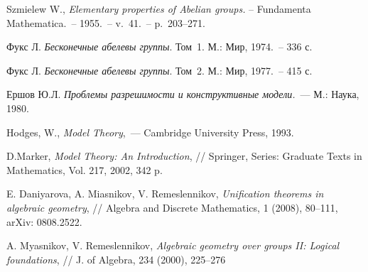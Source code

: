 \documentclass[a4paper,11pt,twoside]{article}
\begin{document}
\begin{thebibliography}{}

 Szmielew W., \textit{Elementary properties of Abelian groups.} -- Fundamenta Mathematica.~-- 1955.~-- v.~41.~-- p.~203--271.

 Фукс Л. \textit{Бесконечные абелевы группы}. Том~1. М.: Мир, 1974.~-- 336 с.

 Фукс Л. \textit{Бесконечные абелевы группы}. Том~2. М.: Мир, 1977.~-- 415 с.

 Ершов Ю.Л. \textit{Проблемы разрешимости и конструктивные модели.}~--- М.: Наука, 1980.

 Hodges, W., \textit{Model Theory},~--- Cambridge University Press, 1993. 

 D.Marker, \textit{Model Theory: An Introduction}, // Springer, Series: Graduate Texts in Mathematics, Vol. 217, 2002, 342 p.

 E. Daniyarova, A. Miasnikov, V. Remeslennikov, \textit{Unification theorems in algebraic geometry}, // Algebra and Discrete Mathematics, 1 (2008), 80--111, arXiv: 0808.2522.

 A. Myasnikov, V. Remeslennikov, \textit{Algebraic geometry over groups II: Logical foundations}, // J. of Algebra, 234 (2000), 225--276

\end{thebibliography}
\end{document}
